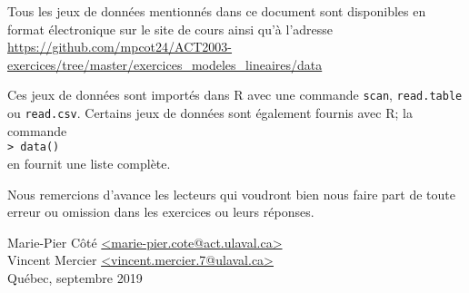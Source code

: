 Tous les jeux de données mentionnés dans ce document sont disponibles en format électronique sur le site de cours ainsi qu'à l'adresse
\url{https://github.com/mpcot24/ACT2003-exercices/tree/master/exercices_modeles_lineaires/data}
  
Ces jeux de données sont importés dans \textsf{R} avec une commande \texttt{scan}, \texttt{read.table} ou \texttt{read.csv}. Certains jeux de données sont également fournis avec \textsf{R}; la commande \\
\texttt{> data()}\\
en fournit une liste complète.

Nous remercions d'avance les lecteurs qui voudront bien nous faire part de toute erreur ou omission dans les exercices ou leurs réponses.



\begin{flushright}
  Marie-Pier Côté \url{<marie-pier.cote@act.ulaval.ca>} \\
  Vincent Mercier \url{<vincent.mercier.7@ulaval.ca>} \\
  Québec, septembre 2019
\end{flushright}

